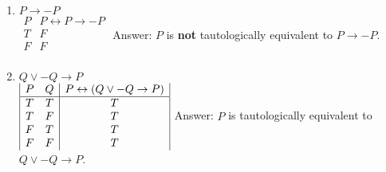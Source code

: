 \documentclass{article}
\begin{document}
\begin{enumerate}[label=(\alph*)]
\item \(P \rightarrow -P\)\\
\(
\begin{array}{|c|c|}
P & P \leftrightarrow P \rightarrow -P\\ 
\hline
T & F\\
F & F\\
\end{array}
\)
\singlespace
Answer: \(P\) is \textbf{not} tautologically equivalent to \(P \rightarrow -P\).\\
\medskip

\item \(Q \lor -Q \rightarrow P\)\\
\(
\begin{array}{|c c|c|}
P & Q & P \leftrightarrow (Q \lor -Q \rightarrow P)\\ 
\hline
T & T & T\\
T & F & T\\
F & T & T\\
F & F & T\\
\end{array}
\)
\singlespace
Answer: \(P\) is tautologically equivalent to \(Q \lor -Q \rightarrow P\).\\
\medskip
\end{enumerate}
\end{document}

